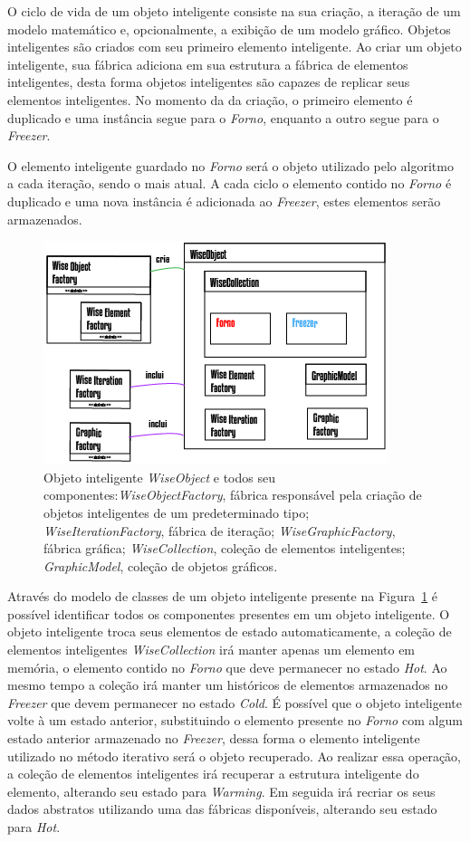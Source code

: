 \documentclass[
        english,			
        brazil			        %
        ,<...>]{abntbibufjf}
\begin{document}
O ciclo de vida de um objeto inteligente consiste na sua criação, a iteração de um modelo matemático e, opcionalmente, a exibição de um modelo gráfico. Objetos inteligentes são criados com seu primeiro elemento inteligente. Ao criar um objeto inteligente, sua fábrica adiciona em sua estrutura a fábrica de elementos inteligentes, desta forma objetos inteligentes são capazes de replicar seus elementos inteligentes. No momento da da criação, o primeiro elemento é duplicado e uma instância segue para o \textit{Forno}, enquanto a outro segue para o \textit{Freezer}.

O elemento inteligente guardado no \textit{Forno} será o objeto utilizado pelo algoritmo a cada iteração, sendo o mais atual. A cada ciclo o elemento contido no \textit{Forno} é duplicado e uma nova instância é adicionada ao \textit{Freezer}, estes elementos serão armazenados.

\begin{figure}[!htbp]
	\centering
	\includegraphics[scale=1]{Figures/WiseObject.png}
	\caption{Objeto inteligente \textit{WiseObject} e todos seu componentes:\textit{WiseObjectFactory}, fábrica responsável pela criação de objetos inteligentes de um predeterminado tipo; \textit{WiseIterationFactory}, fábrica de iteração; \textit{WiseGraphicFactory}, fábrica gráfica; \textit{WiseCollection}, coleção de elementos inteligentes; \textit{GraphicModel}, coleção de objetos gráficos.}
	\label{fig7:wiseobject}
\end{figure}

Através do modelo de classes de um objeto inteligente presente na Figura~\ref{fig7:wiseobject} é possível identificar todos os componentes presentes em um objeto inteligente. O objeto inteligente troca seus elementos de estado automaticamente, a coleção de elementos inteligentes \textit{WiseCollection} irá manter apenas um elemento em memória, o elemento contido no \textit{Forno} que deve permanecer no estado \textit{Hot}. Ao mesmo tempo a coleção irá manter um históricos de elementos armazenados no \textit{Freezer} que devem permanecer no estado \textit{Cold}. É possível que o objeto inteligente volte à um estado anterior, substituindo o elemento presente no \textit{Forno} com algum estado anterior armazenado no \textit{Freezer}, dessa forma o elemento inteligente utilizado no método iterativo será o objeto recuperado. Ao realizar essa operação, a coleção de elementos inteligentes irá recuperar a estrutura inteligente do elemento, alterando seu estado para \textit{Warming}. Em seguida irá recriar os seus dados abstratos utilizando uma das fábricas disponíveis, alterando seu estado para \textit{Hot}.
\end{document}
